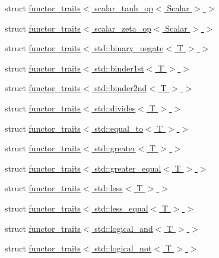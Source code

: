 \begin{DoxyCompactItemize}
\item 
struct \hyperlink{struct_eigen_1_1internal_1_1functor__traits_3_01scalar__tanh__op_3_01_scalar_01_4_01_4}{functor\+\_\+traits$<$ scalar\+\_\+tanh\+\_\+op$<$ Scalar $>$ $>$}
\item 
struct \hyperlink{struct_eigen_1_1internal_1_1functor__traits_3_01scalar__zeta__op_3_01_scalar_01_4_01_4}{functor\+\_\+traits$<$ scalar\+\_\+zeta\+\_\+op$<$ Scalar $>$ $>$}
\item 
struct \hyperlink{struct_eigen_1_1internal_1_1functor__traits_3_01std_1_1binary__negate_3_01_t_01_4_01_4}{functor\+\_\+traits$<$ std\+::binary\+\_\+negate$<$ T $>$ $>$}
\item 
struct \hyperlink{struct_eigen_1_1internal_1_1functor__traits_3_01std_1_1binder1st_3_01_t_01_4_01_4}{functor\+\_\+traits$<$ std\+::binder1st$<$ T $>$ $>$}
\item 
struct \hyperlink{struct_eigen_1_1internal_1_1functor__traits_3_01std_1_1binder2nd_3_01_t_01_4_01_4}{functor\+\_\+traits$<$ std\+::binder2nd$<$ T $>$ $>$}
\item 
struct \hyperlink{struct_eigen_1_1internal_1_1functor__traits_3_01std_1_1divides_3_01_t_01_4_01_4}{functor\+\_\+traits$<$ std\+::divides$<$ T $>$ $>$}
\item 
struct \hyperlink{struct_eigen_1_1internal_1_1functor__traits_3_01std_1_1equal__to_3_01_t_01_4_01_4}{functor\+\_\+traits$<$ std\+::equal\+\_\+to$<$ T $>$ $>$}
\item 
struct \hyperlink{struct_eigen_1_1internal_1_1functor__traits_3_01std_1_1greater_3_01_t_01_4_01_4}{functor\+\_\+traits$<$ std\+::greater$<$ T $>$ $>$}
\item 
struct \hyperlink{struct_eigen_1_1internal_1_1functor__traits_3_01std_1_1greater__equal_3_01_t_01_4_01_4}{functor\+\_\+traits$<$ std\+::greater\+\_\+equal$<$ T $>$ $>$}
\item 
struct \hyperlink{struct_eigen_1_1internal_1_1functor__traits_3_01std_1_1less_3_01_t_01_4_01_4}{functor\+\_\+traits$<$ std\+::less$<$ T $>$ $>$}
\item 
struct \hyperlink{struct_eigen_1_1internal_1_1functor__traits_3_01std_1_1less__equal_3_01_t_01_4_01_4}{functor\+\_\+traits$<$ std\+::less\+\_\+equal$<$ T $>$ $>$}
\item 
struct \hyperlink{struct_eigen_1_1internal_1_1functor__traits_3_01std_1_1logical__and_3_01_t_01_4_01_4}{functor\+\_\+traits$<$ std\+::logical\+\_\+and$<$ T $>$ $>$}
\item 
struct \hyperlink{struct_eigen_1_1internal_1_1functor__traits_3_01std_1_1logical__not_3_01_t_01_4_01_4}{functor\+\_\+traits$<$ std\+::logical\+\_\+not$<$ T $>$ $>$}

\end{DoxyCompactItemize}
